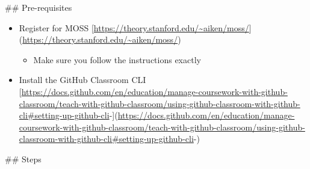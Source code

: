 \documentclass[11pt]{article}
\author{Hao Xiang Liew}
\date{\today}
\title{}
\begin{document}
\tableofcontents

\#\# Pre-requisites
\begin{itemize}
\item Register for MOSS [\url{https://theory.stanford.edu/\~aiken/moss/}](\url{https://theory.stanford.edu/\~aiken/moss/})
\begin{itemize}
\item Make sure you follow the instructions exactly
\end{itemize}
\item Install the GitHub Classroom CLI [\url{https://docs.github.com/en/education/manage-coursework-with-github-classroom/teach-with-github-classroom/using-github-classroom-with-github-cli\#setting-up-github-cli}-](\url{https://docs.github.com/en/education/manage-coursework-with-github-classroom/teach-with-github-classroom/using-github-classroom-with-github-cli\#setting-up-github-cli}-)
\end{itemize}

\#\# Steps
\end{document}
